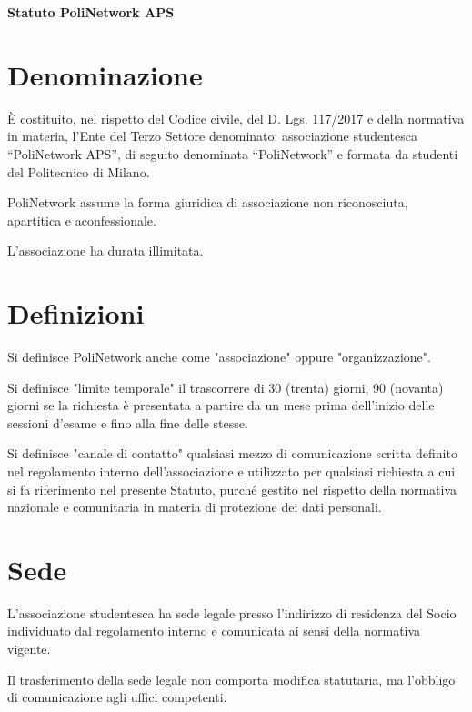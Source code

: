 \documentclass[legalpaper, 11pt]{exam}
\let\tempone\enumerate
\let\temptwo\endenumerate
\renewenvironment{enumerate}{\tempone\addtolength{\itemsep}{-0.45\baselineskip}}{\temptwo}
\begin{document}
\linenumbers

{

\begin{center}


\begin{center}
{\textbf{Statuto PoliNetwork APS}}

\end{center}



\end{center}


\section{Denominazione}
\begin{enumerate}
 \item È costituito, nel rispetto del Codice civile, del D. Lgs. 117/2017 e della normativa in materia, l’Ente del Terzo Settore denominato: associazione studentesca “PoliNetwork APS”, di seguito denominata “PoliNetwork” e formata da studenti del Politecnico di Milano.
 \item PoliNetwork assume la forma giuridica di associazione non riconosciuta, apartitica e aconfessionale.
 \item L'associazione ha durata illimitata.
\end{enumerate}

\section{Definizioni}
\begin{enumerate}
 \item Si definisce PoliNetwork anche come "associazione" oppure "organizzazione".
 \item Si definisce "limite temporale" il trascorrere di 30 (trenta) giorni, 90 (novanta) giorni se la richiesta è presentata a partire da un mese prima dell'inizio delle sessioni d'esame e fino alla fine delle stesse.
 \item Si definisce "canale di contatto" qualsiasi mezzo di comunicazione scritta definito nel regolamento interno dell'associazione e utilizzato per qualsiasi richiesta a cui si fa riferimento nel presente Statuto, purché gestito nel rispetto della normativa nazionale e comunitaria in materia di protezione dei dati personali.
\end{enumerate}

\section{Sede}
\begin{enumerate}
 \item L’associazione studentesca ha sede legale presso l’indirizzo di residenza del Socio individuato dal regolamento interno e comunicata ai sensi della normativa vigente.
 \item Il trasferimento della sede legale non comporta modifica statutaria, ma l’obbligo di comunicazione agli uffici competenti.
\end{enumerate}

}
\end{document}
